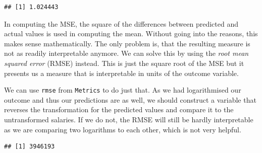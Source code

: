 \documentclass[
]{book}
\newenvironment{Shaded}{\begin{snugshade}}{\end{snugshade}}
\newcommand{\AttributeTok}[1]{\textcolor[rgb]{0.13,0.29,0.53}{#1}}
\newcommand{\FunctionTok}[1]{\textcolor[rgb]{0.13,0.29,0.53}{\textbf{#1}}}
\newcommand{\NormalTok}[1]{#1}
\newcommand{\OtherTok}[1]{\textcolor[rgb]{0.56,0.35,0.01}{#1}}
\newcommand{\SpecialCharTok}[1]{\textcolor[rgb]{0.81,0.36,0.00}{\textbf{#1}}}
\begin{document}
\begin{verbatim}
## [1] 1.024443
\end{verbatim}

In computing the MSE, the square of the differences between predicted and actual
values is used in computing the mean. Without going into the reasons, this makes
sense mathematically. The only problem is, that the resulting measure is not
as readily interpretable anymore. We can solve this by using the
\emph{root mean squared error} (RMSE) instead. This is just the square root of the
MSE but it presents us a measure that is interpretable in units of
the outcome variable.

We can use \texttt{rmse} from \texttt{Metrics} to do just that. As we had logarithmised our
outcome and thus our predictions are as well, we should construct a variable
that reverses the transformation for the predicted values and compare it to the
untransformed salaries. If we do not, the RMSE will still be hardly
interpretable as we are comparing two logarithms to each other, which is not
very helpful.

\begin{Shaded}
\end{Shaded}

\begin{verbatim}
## [1] 3946193
\end{verbatim}

\begin{Shaded}
\end{Shaded}
\end{document}
